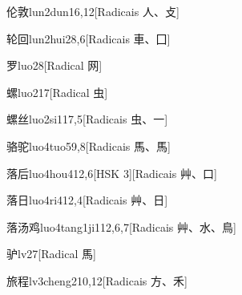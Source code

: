 \begin{entry}{伦敦}{lun2dun1}{6,12}[Radicais ⼈、⽁]
\end{entry}

\begin{entry}{轮回}{lun2hui2}{8,6}[Radicais ⾞、⼞]
\end{entry}

\begin{entry}{罗}{luo2}{8}[Radical ⽹]
\end{entry}

\begin{entry}{螺}{luo2}{17}[Radical ⾍]
\end{entry}

\begin{entry}{螺丝}{luo2si1}{17,5}[Radicais ⾍、⼀]
\end{entry}

\begin{entry}{骆驼}{luo4tuo5}{9,8}[Radicais ⾺、⾺]
\end{entry}

\begin{entry}{落后}{luo4hou4}{12,6}[HSK 3][Radicais ⾋、⼝]
\end{entry}

\begin{entry}{落日}{luo4ri4}{12,4}[Radicais ⾋、⽇]
\end{entry}

\begin{entry}{落汤鸡}{luo4tang1ji1}{12,6,7}[Radicais ⾋、⽔、⿃]
\end{entry}

\begin{entry}{驴}{lv2}{7}[Radical ⾺]
\end{entry}

\begin{entry}{旅程}{lv3cheng2}{10,12}[Radicais ⽅、⽲]
\end{entry}


